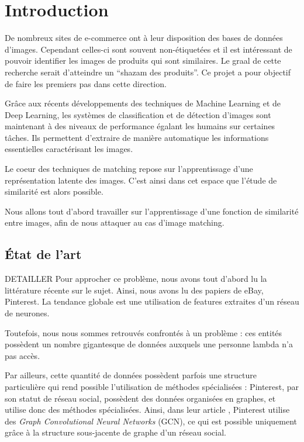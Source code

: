 \section*{Introduction}

De nombreux sites de e-commerce ont à leur disposition des bases de données d’images. Cependant celles-ci sont souvent
non-étiquetées et il est intéressant de pouvoir identifier les images de produits qui sont similaires. Le graal de cette
recherche serait d’atteindre un “shazam des produits”. Ce projet a pour objectif de faire les premiers pas dans cette
direction. 

Grâce aux récents développements des techniques de Machine Learning et de Deep Learning, les systèmes de classification
et de détection d’images sont maintenant à des niveaux de performance égalant les humains sur certaines tâches. Ils
permettent d’extraire de manière automatique les informations essentielles caractérisant les images.

Le coeur des techniques de matching repose sur l’apprentissage d’une représentation latente des images. C’est ainsi dans
cet espace que l’étude de similarité est alors possible.

Nous allons tout d'abord travailler sur l'apprentissage d'une fonction de similarité entre images, afin de nous attaquer
au cas d'image matching.

\subsection*{État de l'art}

DETAILLER
\bigskip
Pour approcher ce problème, nous avons tout d'abord lu la littérature récente sur le sujet. Ainsi, nous avons lu des
papiers de eBay, Pinterest. La tendance globale est une utilisation de features extraites d'un réseau de neurones.

Toutefois, nous nous sommes retrouvés confrontés à un problème : ces entités possèdent un nombre gigantesque de données
auxquels une personne lambda n'a pas accès. 

Par ailleurs, cette quantité de données possèdent parfois une structure particulière qui rend possible l'utilisation de
méthodes spécialisées : Pinterest, par son statut de réseau social, possèdent des données organisées en graphes, et
utilise donc des méthodes spécialisées. Ainsi, dans leur article \cite{ying2018graph}, Pinterest utilise des
\textit{Graph Convolutional Neural Networks} (GCN), ce qui est possible uniquement grâce à la structure sous-jacente de
graphe d'un réseau social.

